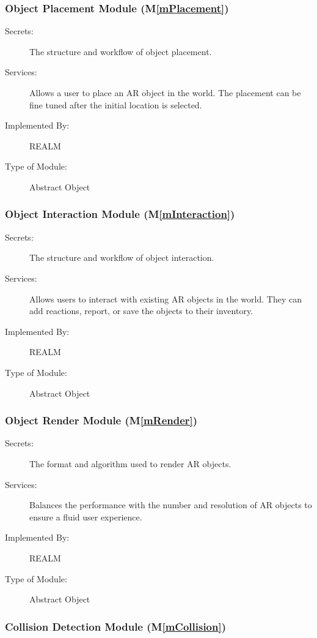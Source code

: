 \documentclass[12pt, titlepage]{article}
\newcommand{\mref}[1]{M\ref{#1}}
\begin{document}
\subsubsection{Object Placement Module (\mref{mPlacement})}

\begin{description}
\item[Secrets:]The structure and workflow of object placement.
\item[Services:]Allows a user to place an AR object in the world. The placement can be fine tuned after the initial location is selected.
\item[Implemented By:]REALM
\item[Type of Module:]Abstract Object
\end{description}

\subsubsection{Object Interaction Module (\mref{mInteraction})}

\begin{description}
\item[Secrets:]The structure and workflow of object interaction.
\item[Services:]Allows users to interact with existing AR objects in the world. They can add reactions, report, or save the objects to their inventory.
\item[Implemented By:]REALM
\item[Type of Module:]Abstract Object
\end{description}

\subsubsection{Object Render Module (\mref{mRender})}

\begin{description}
\item[Secrets:]The format and algorithm used to render AR objects.
\item[Services:]Balances the performance with the number and resolution of AR objects to ensure a fluid user experience.
\item[Implemented By:]REALM
\item[Type of Module:]Abstract Object
\end{description}

\subsubsection{Collision Detection Module (\mref{mCollision})}
\end{document}
